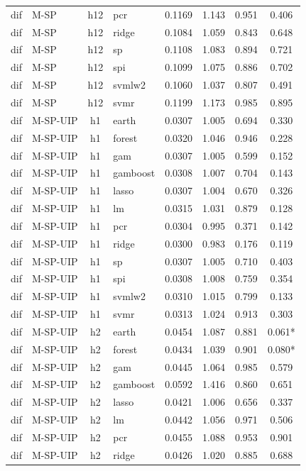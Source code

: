 \begin{ThreePartTable}
\begin{longtable}[t]{llclcccc}
dif & M-SP & h12 & pcr & 0.1169 & 1.143 & 0.951 & 0.406\\
dif & M-SP & h12 & ridge & 0.1084 & 1.059 & 0.843 & 0.648\\
dif & M-SP & h12 & sp & 0.1108 & 1.083 & 0.894 & 0.721\\
dif & M-SP & h12 & spi & 0.1099 & 1.075 & 0.886 & 0.702\\
dif & M-SP & h12 & svmlw2 & 0.1060 & 1.037 & 0.807 & 0.491\\
dif & M-SP & h12 & svmr & 0.1199 & 1.173 & 0.985 & 0.895\\
\addlinespace
dif & M-SP-UIP & h1 & earth & 0.0307 & 1.005 & 0.694 & 0.330\\
dif & M-SP-UIP & h1 & forest & 0.0320 & 1.046 & 0.946 & 0.228\\
dif & M-SP-UIP & h1 & gam & 0.0307 & 1.005 & 0.599 & 0.152\\
dif & M-SP-UIP & h1 & gamboost & 0.0308 & 1.007 & 0.704 & 0.143\\
dif & M-SP-UIP & h1 & lasso & 0.0307 & 1.004 & 0.670 & 0.326\\
dif & M-SP-UIP & h1 & lm & 0.0315 & 1.031 & 0.879 & 0.128\\
dif & M-SP-UIP & h1 & pcr & 0.0304 & 0.995 & 0.371 & 0.142\\
dif & M-SP-UIP & h1 & ridge & 0.0300 & 0.983 & 0.176 & 0.119\\
dif & M-SP-UIP & h1 & sp & 0.0307 & 1.005 & 0.710 & 0.403\\
dif & M-SP-UIP & h1 & spi & 0.0308 & 1.008 & 0.759 & 0.354\\
dif & M-SP-UIP & h1 & svmlw2 & 0.0310 & 1.015 & 0.799 & 0.133\\
dif & M-SP-UIP & h1 & svmr & 0.0313 & 1.024 & 0.913 & 0.303\\
\addlinespace
dif & M-SP-UIP & h2 & earth & 0.0454 & 1.087 & 0.881 & 0.061*\\
dif & M-SP-UIP & h2 & forest & 0.0434 & 1.039 & 0.901 & 0.080*\\
dif & M-SP-UIP & h2 & gam & 0.0445 & 1.064 & 0.985 & 0.579\\
dif & M-SP-UIP & h2 & gamboost & 0.0592 & 1.416 & 0.860 & 0.651\\
dif & M-SP-UIP & h2 & lasso & 0.0421 & 1.006 & 0.656 & 0.337\\
dif & M-SP-UIP & h2 & lm & 0.0442 & 1.056 & 0.971 & 0.506\\
dif & M-SP-UIP & h2 & pcr & 0.0455 & 1.088 & 0.953 & 0.901\\
dif & M-SP-UIP & h2 & ridge & 0.0426 & 1.020 & 0.885 & 0.688\\

\end{longtable}
\end{ThreePartTable}
